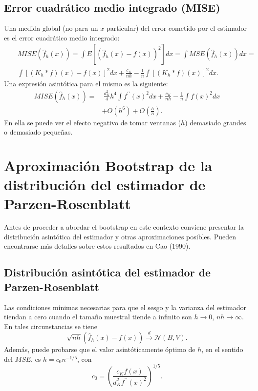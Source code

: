 \documentclass[]{book}
\theoremstyle{definition}
\theoremstyle{definition}
\theoremstyle{definition}
\theoremstyle{remark}
\begin{document}
\subsection{Error cuadrático medio integrado
(MISE)}\label{error-cuadratico-medio-integrado-mise}

Una medida global (no para un \(x\) particular) del error cometido por
el estimador es el error cuadrático medio integrado: \[\begin{aligned}
& & MISE\left( \hat{f}_{h}\left( x \right) \right) =\int E\left[ \left( \hat{f}
_{h}\left( x \right) -f\left( x \right) \right)^2\right] dx=\int MSE\left( 
\hat{f}_{h}\left( x \right) \right) dx= \\
&&\int \left[ \left( K_{h}\ast f \right) \left( x \right) -f\left( x \right) 
\right]^2dx+\frac{c_{K}}{nh}-\frac{1}{n}\int \left[ \left( K_{h}\ast
f \right) \left( x \right) \right]^2dx.
\end{aligned}\] Una expresión asintótica para el mismo es la siguiente:
\[\begin{aligned}
MISE\left( \hat{f}_{h}\left( x \right) \right) =&\ \frac{d_{K}^2}{4}h^4\int
f^{\prime \prime }\left( x \right)^2dx+\frac{c_{K}}{nh}-\frac{1}{n}\int
f\left( x \right)^2dx \\
&+O\left( h^{6} \right) +O \left( \frac{h}{n} \right).
\end{aligned}\] En ella se puede ver el efecto negativo de tomar
ventanas (\(h\)) demasiado grandes o demasiado pequeñas.

\section{Aproximación Bootstrap de la distribución del estimador de
Parzen-Rosenblatt}\label{aproximacion-bootstrap-de-la-distribucion-del-estimador-de-parzen-rosenblatt}

Antes de proceder a abordar el bootstrap en este contexto conviene
presentar la distribución asintótica del estimador y otras
aproximaciones posibles. Pueden encontrarse más detalles sobre estos
resultados en Cao (1990).

\subsection{Distribución asintótica del estimador de
Parzen-Rosenblatt}\label{distribucion-asintotica-del-estimador-de-parzen-rosenblatt}

Las condiciones mínimas necesarias para que el sesgo y la varianza del
estimador tiendan a cero cuando el tamaño muestral tiende a infinito son
\(h\rightarrow 0\), \(nh\rightarrow \infty\). En tales circunstancias se
tiene
\[\sqrt{nh}\left( \hat{f}_{h}\left( x \right) -f\left( x \right) \right) \overset
{d}{\rightarrow }\mathcal{N}\left( B,V \right) \text{.}\]Además, puede
probarse que el valor asintóticamente óptimo de \(h\), en el sentido del
\(MSE\), es \(h=c_{0}n^{-1/5}\), con
\[c_{0}=\left( \frac{c_{K}f\left( x \right)}{d_{K}^2f^{\prime \prime }\left(
x \right)^2} \right)^{1/5}.\]
\end{document}
